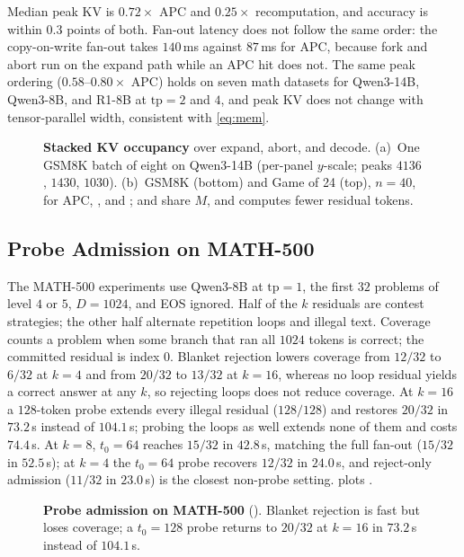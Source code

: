 Median peak KV is $0.72\times$ APC and $0.25\times$ recomputation, and accuracy is within $0.3$ points of both.
Fan-out latency does not follow the same order: the copy-on-write fan-out takes $140$\,ms against $87$\,ms for APC, because fork and abort run on the expand path while an APC hit does not.
The same peak ordering ($0.58$--$0.80\times$ APC) holds on seven math datasets for Qwen3-14B, Qwen3-8B, and R1-8B at $\mathrm{tp}{=}2$ and $4$, and peak KV does not change with tensor-parallel width, consistent with \eqref{eq:mem}.

\begin{figure}[t]
\centering
\resizebox{\textwidth}{!}{}
\caption{\textbf{Stacked KV occupancy} over expand, abort, and decode.
(a)~One GSM8K batch of eight on Qwen3-14B (per-panel $y$-scale; peaks $4136$, $1430$, $1030$).
(b)~GSM8K (bottom) and Game of 24 (top), $n{=}40$, for APC, \cowonly, and \sys; \cowonly and \sys share $M$, and \sys computes fewer residual tokens.}
\label{fig:eval-stack}
\end{figure}

\subsection{Probe Admission on MATH-500}
\label{sec:eval-grow}

The MATH-500 experiments use Qwen3-8B at $\mathrm{tp}{=}1$, the first $32$ problems of level $4$ or $5$, $D{=}1024$, and EOS ignored.
Half of the $k$ residuals are contest strategies; the other half alternate repetition loops and illegal text.
Coverage counts a problem when some branch that ran all $1024$ tokens is correct; the committed residual is index $0$.
Blanket rejection lowers coverage from $12/32$ to $6/32$ at $k{=}4$ and from $20/32$ to $13/32$ at $k{=}16$, whereas no loop residual yields a correct answer at any $k$, so rejecting loops does not reduce coverage.
At $k{=}16$ a $128$-token probe extends every illegal residual ($128/128$) and restores $20/32$ in $73.2$\,s instead of $104.1$\,s; probing the loops as well extends none of them and costs $74.4$\,s.
At $k{=}8$, $t_0{=}64$ reaches $15/32$ in $42.8$\,s, matching the full fan-out ($15/32$ in $52.5$\,s); at $k{=}4$ the $t_0{=}64$ probe recovers $12/32$ in $24.0$\,s, and reject-only admission ($11/32$ in $23.0$\,s) is the closest non-probe setting.
 plots .

\begin{figure}[t]
\centering
\resizebox{\textwidth}{!}{}
\caption{\textbf{Probe admission on MATH-500} ().
Blanket rejection is fast but loses coverage; a $t_0{=}128$ probe returns to $20/32$ at $k{=}16$ in $73.2$\,s instead of $104.1$\,s.}
\label{fig:eval-grow}
\end{figure}

